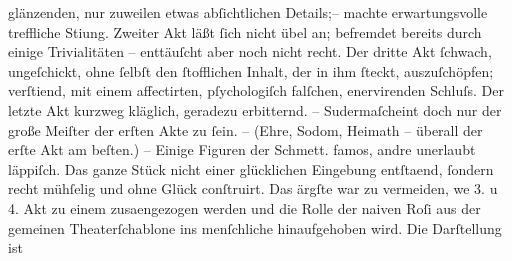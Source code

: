 \begin{ledgroupsized}[t]{13cm}
               glänzenden, nur zuweilen etwas abſichtlichen Details;– machte erwartungsvolle
               treffliche Sti{\geminationm}ung. Zweiter Akt läßt ſich nicht übel an;
               befremdet bereits durch einige Trivialitäten – enttäuſcht aber noch nicht recht. Der
               dritte Akt {\pb}ſchwach, ungeſchickt, ohne ſelbſt den
               ſtofflichen Inhalt, der in ihm ſteckt, auszuſchöpfen; verſti{\geminationm}end, mit einem affectirten, pſychologiſch falſchen,
               enervirenden Schluſs. Der letzte Akt kurzweg kläglich, geradezu erbitternd. – Suderma{\geminationn}ſcheint doch nur der große Meiſter der erſten Akte
               zu ſein. – (Ehre, Sodom, Heimath – {\pb}überall der erſte Akt am beſten.) – Einige Figuren der
                  Schmett. famos, andre unerlaubt läppiſch. Das
               ganze Stück nicht einer glücklichen Eingebung entſta{\geminationm}end, ſondern recht mühſelig und ohne Glück conſtruirt. Das ärgſte war zu vermeiden,
                  we{\geminationn} 3. u 4. Akt zu einem zusa{\geminationm}enge{\pb}zogen werden und
               die Rolle der naiven Roſi aus der
               gemeinen Theaterſchablone ins menſchliche hinaufgehoben wird. Die Darſtellung ist

\end{ledgroupsized}
